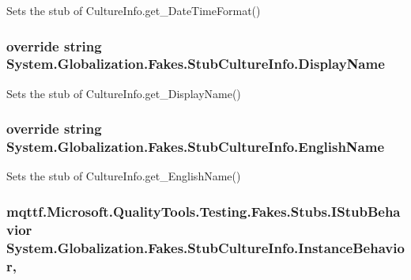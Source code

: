 Sets the stub of Culture\-Info.\-get\-\_\-\-Date\-Time\-Format()

\hypertarget{class_system_1_1_globalization_1_1_fakes_1_1_stub_culture_info_a9e0d79917943dee79b8dbe7bca661dd0}{
\subsubsection[{Display\-Name}]{\setlength{\rightskip}{0pt plus 5cm}override string System.\-Globalization.\-Fakes.\-Stub\-Culture\-Info.\-Display\-Name\hspace{0.3cm}{\ttfamily [get]}}}\label{class_system_1_1_globalization_1_1_fakes_1_1_stub_culture_info_a9e0d79917943dee79b8dbe7bca661dd0}


Sets the stub of Culture\-Info.\-get\-\_\-\-Display\-Name()

\hypertarget{class_system_1_1_globalization_1_1_fakes_1_1_stub_culture_info_a96c5f0873a53babbdaf8c827a86b9b82}{
\subsubsection[{English\-Name}]{\setlength{\rightskip}{0pt plus 5cm}override string System.\-Globalization.\-Fakes.\-Stub\-Culture\-Info.\-English\-Name\hspace{0.3cm}{\ttfamily [get]}}}\label{class_system_1_1_globalization_1_1_fakes_1_1_stub_culture_info_a96c5f0873a53babbdaf8c827a86b9b82}


Sets the stub of Culture\-Info.\-get\-\_\-\-English\-Name()

\hypertarget{class_system_1_1_globalization_1_1_fakes_1_1_stub_culture_info_a225f159f9e948b82b5ae14ca4c2e5791}{
\subsubsection[{Instance\-Behavior}]{\setlength{\rightskip}{0pt plus 5cm}mqttf.\-Microsoft.\-Quality\-Tools.\-Testing.\-Fakes.\-Stubs.\-I\-Stub\-Behavior System.\-Globalization.\-Fakes.\-Stub\-Culture\-Info.\-Instance\-Behavior\hspace{0.3cm}{\ttfamily [get]}, {\ttfamily [set]}}}\label{class_system_1_1_globalization_1_1_fakes_1_1_stub_culture_info_a225f159f9e948b82b5ae14ca4c2e5791}


